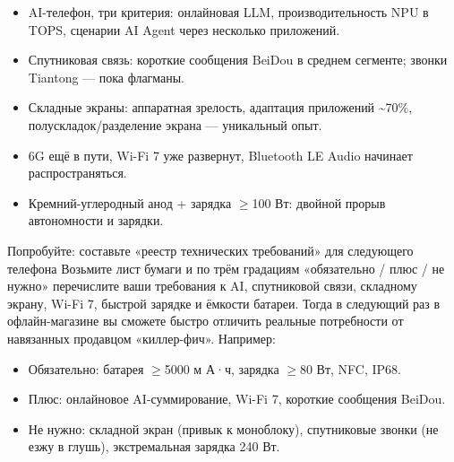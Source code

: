 
\begin{itemize}
  \item AI-телефон, три критерия: онлайновая LLM, производительность NPU в TOPS, сценарии AI Agent через несколько приложений.
  \item Спутниковая связь: короткие сообщения BeiDou в среднем сегменте; звонки Tiantong — пока флагманы.
  \item Складные экраны: аппаратная зрелость, адаптация приложений \textasciitilde{}70\%, полускладок/разделение экрана — уникальный опыт.
  \item 6G ещё в пути, Wi-Fi 7 уже развернут, Bluetooth LE Audio начинает распространяться.
  \item Кремний-углеродный анод + зарядка $\geq$100 Вт: двойной прорыв автономности и зарядки.
\end{itemize}

\begin{tcbpractice}{Попробуйте: составьте «реестр технических требований» для следующего телефона}
Возьмите лист бумаги и по трём градациям «обязательно / плюс / не нужно» перечислите ваши требования к AI, спутниковой связи, складному экрану, Wi-Fi 7, быстрой зарядке и ёмкости батареи. Тогда в следующий раз в офлайн-магазине вы сможете быстро отличить реальные потребности от навязанных продавцом «киллер-фич». Например:

\begin{itemize}
  \item Обязательно: батарея $\geq$5000 м А·ч, зарядка $\geq$80 Вт, NFC, IP68.
  \item Плюс: онлайновое AI-суммирование, Wi-Fi 7, короткие сообщения BeiDou.
  \item Не нужно: складной экран (привык к моноблоку), спутниковые звонки (не езжу в глушь), экстремальная зарядка 240 Вт.
\end{itemize}

\end{tcbpractice}

